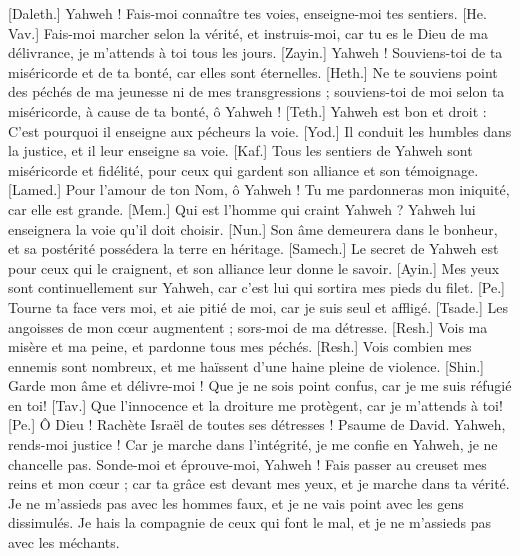 \begin{multicols}{2}
[Daleth.] Yahweh ! Fais-moi connaître tes voies, enseigne-moi tes sentiers.
[He. Vav.] Fais-moi marcher selon la vérité, et instruis-moi, car tu es le Dieu de ma délivrance, je m'attends à toi tous les jours.
[Zayin.] Yahweh ! Souviens-toi de ta miséricorde et de ta bonté, car elles sont éternelles.
[Heth.] Ne te souviens point des péchés de ma jeunesse ni de mes transgressions ; souviens-toi de moi selon ta miséricorde, à cause de ta bonté, ô Yahweh !
[Teth.] Yahweh est bon et droit : C'est pourquoi il enseigne aux pécheurs la voie.
[Yod.] Il conduit les humbles dans la justice, et il leur enseigne sa voie.
[Kaf.] Tous les sentiers de Yahweh sont miséricorde et fidélité, pour ceux qui gardent son alliance et son témoignage.
[Lamed.] Pour l'amour de ton Nom, ô Yahweh ! Tu me pardonneras mon iniquité, car elle est grande.
[Mem.] Qui est l'homme qui craint Yahweh ? Yahweh lui enseignera la voie qu'il doit choisir.
[Nun.] Son âme demeurera dans le bonheur, et sa postérité possédera la terre en héritage.
[Samech.] Le secret de Yahweh est pour ceux qui le craignent, et son alliance leur donne le savoir.
[Ayin.] Mes yeux sont continuellement sur Yahweh, car c'est lui qui sortira mes pieds du filet.
[Pe.] Tourne ta face vers moi, et aie pitié de moi, car je suis seul et affligé.
[Tsade.] Les angoisses de mon cœur augmentent ; sors-moi de ma détresse.
[Resh.] Vois ma misère et ma peine, et pardonne tous mes péchés.
[Resh.] Vois combien mes ennemis sont nombreux, et me haïssent d'une haine pleine de violence.
[Shin.] Garde mon âme et délivre-moi ! Que je ne sois point confus, car je me suis réfugié en toi!
[Tav.] Que l'innocence et la droiture me protègent, car je m'attends à toi!
[Pe.] Ô Dieu ! Rachète Israël de toutes ses détresses !
\VerseOne{}Psaume de David. Yahweh, rends-moi justice ! Car je marche dans l'intégrité, je me confie en Yahweh, je ne chancelle pas.
Sonde-moi et éprouve-moi, Yahweh ! Fais passer au creuset mes reins et mon cœur ;
car ta grâce est devant mes yeux, et je marche dans ta vérité.
Je ne m'assieds pas avec les hommes faux, et je ne vais point avec les gens dissimulés.
Je hais la compagnie de ceux qui font le mal, et je ne m'assieds pas avec les méchants.

\end{multicols}
